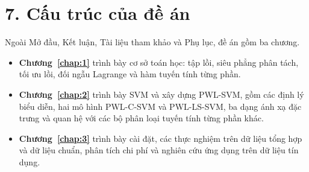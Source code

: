 \section*{7. Cấu trúc của đề án}

Ngoài Mở đầu, Kết luận, Tài liệu tham khảo và Phụ lục, đề án gồm ba chương.

\begin{itemize}
\item[-] \textbf{Chương~\ref{chap:1}} trình bày cơ sở toán học: tập lồi, siêu phẳng phân tách, tối ưu lồi, đối ngẫu Lagrange và hàm tuyến tính từng phần.
\item[-] \textbf{Chương~\ref{chap:2}} trình bày SVM và xây dựng PWL-SVM, gồm các định lý biểu diễn, hai mô hình PWL-C-SVM và PWL-LS-SVM, ba dạng ánh xạ đặc trưng và quan hệ với các bộ phân loại tuyến tính từng phần khác. 
\item[-] \textbf{Chương~\ref{chap:3}} trình bày cài đặt, các thực nghiệm trên dữ liệu tổng hợp và dữ liệu chuẩn, phân tích chi phí và nghiên cứu ứng dụng trên dữ liệu tín dụng.
\end{itemize}

